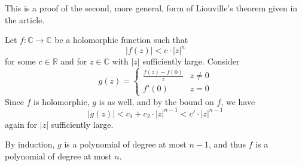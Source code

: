 \documentclass[12pt]{article}
\newcommand{\Reals}{\mathbb{R}}
\newcommand{\Complex}{\mathbb{C}}
\begin{document}
This is a proof of the second, more general, form of Liouville's theorem given in the  article.

Let $f:\Complex\to\Complex$ be a holomorphic function such that
$$|f(z)| < c \cdot |z|^n$$
for some $c\in\Reals$ and for $z\in\Complex$ with $|z|$ sufficiently large. Consider
$$g(z)=\begin{cases}\frac{f(z)-f(0)}{z}&z\neq 0\\
f'(0)&z=0
\end{cases}
$$
Since $f$ is holomorphic, $g$ is as well, and by the bound on $f$, we have
\[|g(z)|< c_1 + c_2 \cdot |z|^{n-1} < c'\cdot |z|^{n-1}\]
again for $|z|$ sufficiently large.

By induction, $g$ is a polynomial of degree at most $n-1$, and thus $f$ is a polynomial of degree at most $n$.
\end{document}
